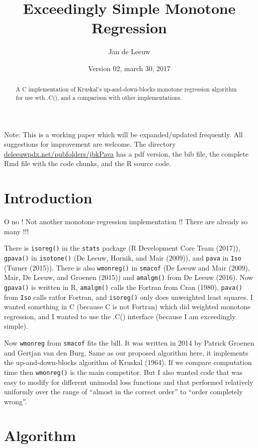 \documentclass[12pt,]{article}
\title{Exceedingly Simple Monotone Regression}
\author{Jan de Leeuw}
\date{Version 02, march 30, 2017}
\begin{document}
\maketitle
\begin{abstract}
A C implementation of Kruskal's up-and-down-blocks monotone regression
algorithm for use wth .C(), and a comparison with other implementations.
\end{abstract}

{
\setcounter{tocdepth}{3}
\tableofcontents
}
Note: This is a working paper which will be expanded/updated frequently.
All suggestions for improvement are welcome. The directory
\href{http://deleeuwpdx.net/pubfolders/jbkPava}{deleeuwpdx.net/pubfolders/jbkPava}
has a pdf version, the bib file, the complete Rmd file with the code
chunks, and the R source code.

\section{Introduction}\label{introduction}

O no ! Not another monotone regression implementation !! There are
already so many !!!

There is \texttt{isoreg()} in the \texttt{stats} package (R Development
Core Team (2017)), \texttt{gpava()} in \texttt{isotone()} (De Leeuw,
Hornik, and Mair (2009)), and \texttt{pava} in \texttt{Iso} (Turner
(2015)). There is also \texttt{wmonreg()} in \texttt{smacof} (De Leeuw
and Mair (2009), Mair, De Leeuw, and Groenen (2015)) and
\texttt{amalgm()} from De Leeuw (2016). Now \texttt{gpava()} is written
in R, \texttt{amalgm()} calls the Fortran from Cran (1980),
\texttt{pava()} from \texttt{Iso} calls ratfor Fortran, and
\texttt{isoreg()} only does unweighted least squares. I wanted something
in C (because C is not Fortran) which did weighted monotone regression,
and I wanted to use the .C() interface (because I am exceedingly
simple).

Now \texttt{wmonreg} from \texttt{smacof} fits the bill. It was written
in 2014 by Patrick Groenen and Gertjan van den Burg. Same as our
proposed algorithm here, it implements the up-and-down-blocks algorithm
of Kruskal (1964). If we compare computation time then
\texttt{wmonreg()} is the main competitor. But I also wanted code that
was easy to modify for different unimodal loss functions and that
performed relatively uniformly over the range of ``almost in the correct
order'' to ``order completely wrong''.

\section{Algorithm}\label{algorithm}
\end{document}
